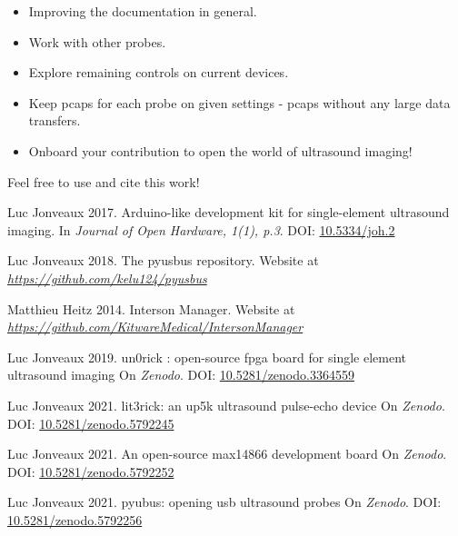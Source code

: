 \documentclass{article}
\begin{document}
\begin{itemize}
\item Improving the documentation in general.
\item Work with other probes.
\item Explore remaining controls on current devices. 
\item Keep pcaps for each probe on given settings - pcaps without any large data transfers.
\item Onboard your contribution to open the world of ultrasound imaging!
\end{itemize}

Feel free to use and cite this work!


%                        
                         
  
\begin{thebibliography}{1}

Luc Jonveaux 2017.
\newblock  Arduino-like development kit for single-element ultrasound imaging. 
\newblock In {\em  Journal of Open Hardware, 1(1), p.3}. DOI: \href{http://doi.org/10.5334/joh.2}{10.5334/joh.2}

Luc Jonveaux 2018.
\newblock The pyusbus repository.
\newblock Website at {\em\href{https://github.com/kelu124/pyusbus}{https://github.com/kelu124/pyusbus}}

Matthieu Heitz 2014.
\newblock Interson Manager.
\newblock Website at {\em\href{https://github.com/KitwareMedical/IntersonManager}{https://github.com/KitwareMedical/IntersonManager}}

Luc Jonveaux 2019.
\newblock  un0rick : open-source fpga board for single element ultrasound imaging
\newblock On {\em  Zenodo}. DOI: \href{http://doi.org/10.5281/zenodo.3364559}{10.5281/zenodo.3364559}

Luc Jonveaux 2021.
\newblock lit3rick: an up5k ultrasound pulse-echo device %
\newblock On {\em  Zenodo}. DOI: \href{http://doi.org/10.5281/zenodo.5792245}{10.5281/zenodo.5792245}

Luc Jonveaux 2021.
\newblock An open-source max14866 development board %
\newblock On {\em  Zenodo}. DOI: \href{http://doi.org/10.5281/zenodo.5792252}{10.5281/zenodo.5792252}

Luc Jonveaux 2021.
\newblock  pyubus: opening usb ultrasound probes  %
\newblock On {\em  Zenodo}. DOI: \href{http://doi.org/10.5281/zenodo.5792256}{10.5281/zenodo.5792256}

\end{thebibliography}
\end{document}
